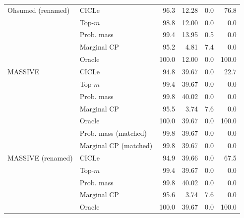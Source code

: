\begin{tabular}{llrrrr}
Ohsumed (renamed) & CICLe & 96.3 & 12.28 & 0.0 & 76.8 \\
 & Top-$m$ & 98.8 & 12.00 & 0.0 & 0.0 \\
 & Prob. mass & 99.4 & 13.95 & 0.5 & 0.0 \\
 & Marginal CP & 95.2 & 4.81 & 7.4 & 0.0 \\
 & Oracle & 100.0 & 12.00 & 0.0 & 100.0 \\
\addlinespace
MASSIVE & CICLe & 94.8 & 39.67 & 0.0 & 22.7 \\
 & Top-$m$ & 99.4 & 39.67 & 0.0 & 0.0 \\
 & Prob. mass & 99.8 & 40.02 & 0.0 & 0.0 \\
 & Marginal CP & 95.5 & 3.74 & 7.6 & 0.0 \\
 & Oracle & 100.0 & 39.67 & 0.0 & 100.0 \\
 & Prob. mass (matched) & 99.8 & 39.67 & 0.0 & 0.0 \\
 & Marginal CP (matched) & 99.8 & 39.67 & 0.0 & 0.0 \\
\addlinespace
MASSIVE (renamed) & CICLe & 94.9 & 39.66 & 0.0 & 67.5 \\
 & Top-$m$ & 99.4 & 39.67 & 0.0 & 0.0 \\
 & Prob. mass & 99.8 & 40.02 & 0.0 & 0.0 \\
 & Marginal CP & 95.6 & 3.74 & 7.6 & 0.0 \\
 & Oracle & 100.0 & 39.67 & 0.0 & 100.0 \\
\bottomrule
\end{tabular}
